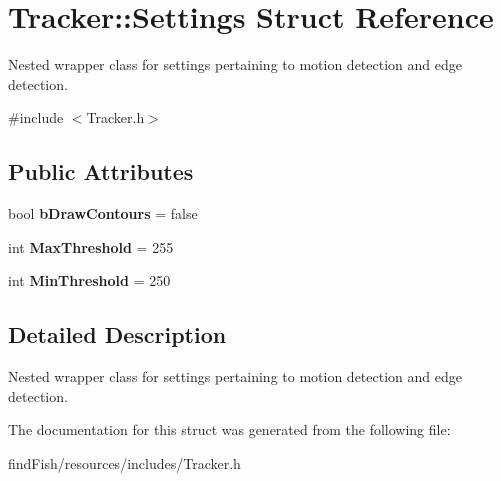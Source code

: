 \hypertarget{struct_tracker_1_1_settings}{}\section{Tracker\+::Settings Struct Reference}
\label{struct_tracker_1_1_settings}


Nested wrapper class for settings pertaining to motion detection and edge detection.  




{\ttfamily \#include $<$Tracker.\+h$>$}

\subsection*{Public Attributes}
\begin{DoxyCompactItemize}
\item 
\mbox{\label{struct_tracker_1_1_settings_a7ba79b34148af1e89e1498673ba5b048}} 
bool {\bfseries b\+Draw\+Contours} = false
\item 
\mbox{\label{struct_tracker_1_1_settings_aaa405b75373b552f22fe34e69eeae8b8}} 
int {\bfseries Max\+Threshold} = 255
\item 
\mbox{\label{struct_tracker_1_1_settings_a1e3ad2cd0c9bd3667585996605e95d77}} 
int {\bfseries Min\+Threshold} = 250
\end{DoxyCompactItemize}


\subsection{Detailed Description}
Nested wrapper class for settings pertaining to motion detection and edge detection. 

The documentation for this struct was generated from the following file\+:\begin{DoxyCompactItemize}
\item 
find\+Fish/resources/includes/Tracker.\+h\end{DoxyCompactItemize}
